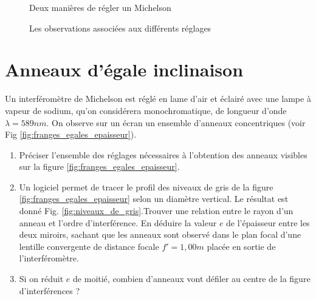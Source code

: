 \documentclass{article}
\begin{document}
\begin{figure}[htbp]
  \caption{Deux manières de régler un Michelson}
\end{figure}




\begin{figure}[h!]
  \caption{Les observations associées aux différents réglages}
\end{figure}


\newpage
\section{Anneaux d'égale inclinaison}

Un interféromètre de Michelson est réglé en lame d'air et éclairé avec une lampe à vapeur de sodium, qu'on considérera monochromatique, de longueur d'onde $\lambda = 589nm$.
On observe sur un écran un ensemble d'anneaux concentriques (voir Fig \ref{fig:franges_egales_epaisseur}). 
\begin{enumerate}
  \item Préciser l'ensemble des réglages nécessaires à l'obtention des anneaux visibles sur la figure \ref{fig:franges_egales_epaisseur}. 
  \item Un logiciel permet de tracer le profil des niveaux de gris de la figure \ref{fig:franges_egales_epaisseur} selon un diamètre vertical. Le résultat est donné Fig. \ref{fig:niveaux_de_gris}.Trouver une relation entre le rayon d'un anneau et l'ordre d'interférence. En déduire la valeur $e$ de l'épaisseur entre les deux miroirs, sachant que les anneaux sont observé dans le plan focal d'une lentille convergente de distance focale $f'=1,00m$ placée en sortie de l'interféromètre.
  \item Si on réduit $e$ de moitié, combien d'anneaux vont défiler au centre de la figure d'interférences ?  
\end{enumerate}
\end{document}

